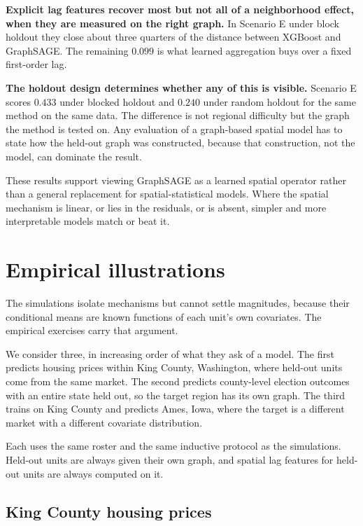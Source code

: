 \documentclass[ASNA, twocolumn]{USG} %
\begin{document}
\textbf{Explicit lag features recover most but not all of a neighborhood effect, when they are measured on the right graph.} In Scenario E under block holdout they close about three quarters of the distance between XGBoost and GraphSAGE. The remaining \(0.099\) is what learned aggregation buys over a fixed first-order lag.

\textbf{The holdout design determines whether any of this is visible.} Scenario E scores \(0.433\) under blocked holdout and \(0.240\) under random holdout for the same method on the same data. The difference is not regional difficulty but the graph the method is tested on. Any evaluation of a graph-based spatial model has to state how the held-out graph was constructed, because that construction, not the model, can dominate the result.

These results support viewing GraphSAGE as a learned spatial operator rather than a general replacement for spatial-statistical models. Where the spatial mechanism is linear, or lies in the residuals, or is absent, simpler and more interpretable models match or beat it.

\section{Empirical illustrations}
\label{sec:illustration}

The simulations isolate mechanisms but cannot settle magnitudes, because their conditional means are known functions of each unit's own covariates. The empirical exercises carry that argument.

We consider three, in increasing order of what they ask of a model. The first predicts housing prices within King County, Washington, where held-out units come from the same market. The second predicts county-level election outcomes with an entire state held out, so the target region has its own graph. The third trains on King County and predicts Ames, Iowa, where the target is a different market with a different covariate distribution.

Each uses the same roster and the same inductive protocol as the simulations. Held-out units are always given their own graph, and spatial lag features for held-out units are always computed on it.

\subsection{King County housing prices}
\end{document}
